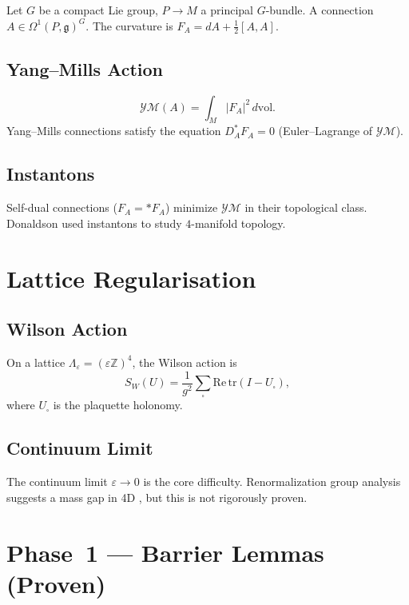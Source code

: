 \documentclass[12pt]{article}
\theoremstyle{plain}
\theoremstyle{definition}
\begin{document}
Let $G$ be a compact Lie group, $P \to M$ a principal $G$-bundle.
A connection $A \in \Omega^1(P,\mathfrak{g})^G$.
The curvature is $F_A = dA + \tfrac12 [A,A]$.

\subsection{Yang--Mills Action}

\[
  \mathcal{YM}(A) = \int_M |F_A|^2\,d\mathrm{vol}.
\]
Yang--Mills connections satisfy the equation
$D_A^* F_A = 0$ (Euler--Lagrange of $\mathcal{YM}$).

\subsection{Instantons}

Self-dual connections ($F_A = *F_A$) minimize $\mathcal{YM}$ in their
topological class.  Donaldson \cite{Donaldson1983} used instantons to
study $4$-manifold topology.

\section{Lattice Regularisation}

\subsection{Wilson Action}

On a lattice $\Lambda_\varepsilon = (\varepsilon\mathbb{Z})^4$, the
Wilson action is
\[
  S_W(U) = \frac{1}{g^2}\sum_{\square} \mathrm{Re}\,\mathrm{tr}(I - U_\square),
\]
where $U_\square$ is the plaquette holonomy.

\subsection{Continuum Limit}

The continuum limit $\varepsilon \to 0$ is the core difficulty.
Renormalization group analysis suggests a mass gap in 4D
\cite{GrossWilczek1973,Politzer1973}, but this is not rigorously proven.

\section{Phase~1 — Barrier Lemmas (Proven)}
\end{document}
